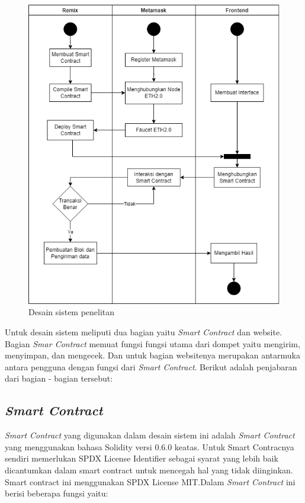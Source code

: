 \begin{figure}[htp!]
	\centering
	\includegraphics[scale=0.45]{gambar/alur_penelitian.png}
	\caption{Desain sistem penelitan}
	\label{fig:desainsist}
\end{figure}

Untuk desain sistem meliputi dua bagian yaitu \emph{Smart Contract} dan website. Bagian \emph{Smar Contract} memuat fungsi fungsi utama dari dompet yaitu mengirim, menyimpan, dan mengecek. Dan untuk bagian websitenya merupakan antarmuka antara pengguna dengan fungsi dari \emph{Smart Contract}. Berikut adalah penjabaran dari bagian - bagian tersebut:

\subsection{\emph{Smart Contract}}
\label{subsec:smartcontract} 

\emph{Smart Contract} yang digunakan dalam desain sistem ini adalah \emph{Smart Contract} yang menggunakan bahasa Solidity versi 0.6.0 keatas. Untuk Smart Contracnya sendiri memerlukan SPDX License Identifier sebagai syarat yang lebih baik dicantumkan dalam smart contract untuk mencegah hal yang tidak diinginkan. Smart contract ini menggunakan SPDX License MIT.Dalam \emph{Smart Contract} ini berisi beberapa fungsi yaitu:

